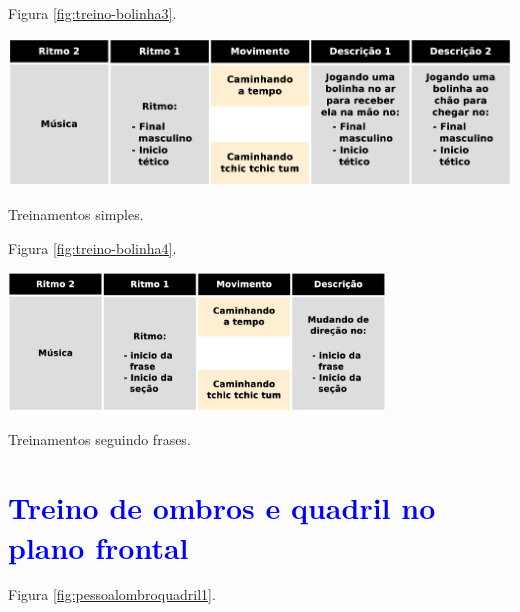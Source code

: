 Figura \ref{fig:treino-bolinha3}.

\begin{table}[!h]
  \centering
    \includegraphics[width=1.0\textwidth]{chapters/cap-body-control/treino-bolinha3.eps}
\caption{Treinamentos simples.}
\label{fig:treino-bolinha3}
\end{table}

Figura \ref{fig:treino-bolinha4}.

\begin{table}[!h]
  \centering
    \includegraphics[width=0.75\textwidth]{chapters/cap-body-control/treino-bolinha4.eps}
\caption{Treinamentos seguindo frases.}
\label{fig:treino-bolinha4}
\end{table}

\section{\textcolor{blue}{ Treino de ombros e quadril no plano frontal}}

Figura \ref{fig:pessoalombroquadril1}.

